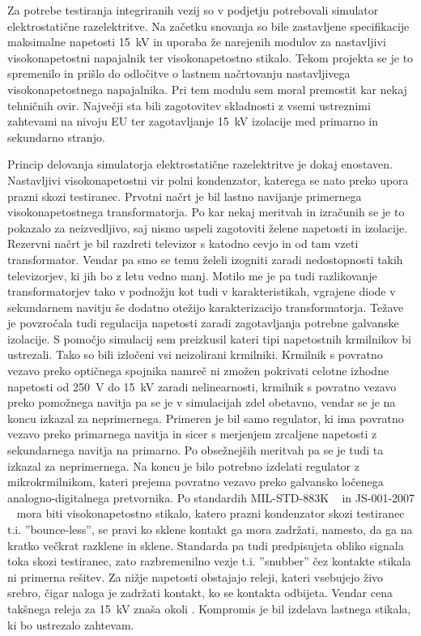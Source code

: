 \documentclass[a4paper,twoside,openright,12pt,Slovene]{book}
\begin{document}
Za potrebe testiranja integriranih vezij so v podjetju potrebovali simulator elektrostatične razelektritve. Na začetku snovanja so bile zastavljene specifikacije maksimalne napetosti \SI{15}{\kilo\volt} in uporaba že narejenih modulov za nastavljivi visokonapetostni napajalnik ter visokonapetostno stikalo. Tekom projekta se je to spremenilo in prišlo do odločitve o lastnem načrtovanju nastavljivega visokonapetostnega napajalnika. Pri tem modulu sem moral premostit kar nekaj tehničnih ovir. Največji sta bili zagotovitev skladnosti z vsemi ustreznimi zahtevami na nivoju EU ter zagotavljanje \SI{15}{\kilo\volt} izolacije med primarno in sekundarno stranjo.   

Princip delovanja simulatorja elektrostatične razelektritve je dokaj enostaven. Nastavljivi visokonapetostni vir polni kondenzator, katerega se nato preko upora prazni skozi testiranec.    
Prvotni načrt je bil lastno navijanje primernega visokonapetostnega transformatorja. Po kar nekaj meritvah in izračunih se je to pokazalo za neizvedljivo, saj nismo uspeli zagotoviti želene napetosti in izolacije. Rezervni načrt je bil razdreti televizor s katodno cevjo in od tam vzeti transformator. Vendar pa smo se temu želeli izogniti zaradi nedostopnosti takih televizorjev, ki jih bo z letu vedno manj. Motilo me je pa tudi razlikovanje transformatorjev tako v podnožju kot tudi v karakteristikah, vgrajene diode v sekundarnem navitju še dodatno otežijo karakterizacijo transformatorja. 
Težave je povzročala tudi regulacija napetosti zaradi zagotavljanja potrebne galvanske izolacije. S pomočjo simulacij sem preizkusil kateri tipi napetostnih krmilnikov bi ustrezali. Tako so bili izločeni vsi neizolirani krmilniki. Krmilnik s povratno vezavo preko optičnega spojnika namreč ni zmožen pokrivati celotne izhodne napetosti od \SI{250}{\volt} do \SI{15}{\kilo\volt} zaradi nelinearnosti, krmilnik s povratno vezavo preko pomožnega navitja pa se je v simulacijah zdel obetavno, vendar se je na koncu izkazal za neprimernega. Primeren je bil samo regulator, ki ima povratno vezavo preko primarnega navitja in sicer s merjenjem zrcaljene napetosti z sekundarnega navitja na primarno. Po obsežnejših meritvah pa se je tudi ta izkazal za neprimernega. Na koncu je bilo potrebno izdelati regulator z mikrokrmilnikom, kateri prejema povratno vezavo preko galvansko ločenega analogno-digitalnega pretvornika.
Po standardih MIL-STD-883K ~\cite{MIL-STD-883K} in JS-001-2007 ~\cite{JS-001-2017} mora biti visokonapetostno stikalo, katero prazni kondenzator skozi testiranec t.i. ''bounce-less'', se pravi ko sklene kontakt ga mora zadržati, namesto, da ga na kratko večkrat razklene in sklene. Standarda pa tudi predpisujeta obliko signala toka skozi testiranec, zato razbremenilno vezje t.i. ''snubber'' čez kontakte stikala ni primerna rešitev. Za nižje napetosti obstajajo releji, kateri vsebujejo živo srebro, čigar naloga je zadržati kontakt, ko se kontakta odbijeta. Vendar cena takšnega releja za \SI{15}{\kilo\volt} znaša okoli .
Kompromis je bil izdelava lastnega stikala, ki bo ustrezalo zahtevam.
\end{document}
